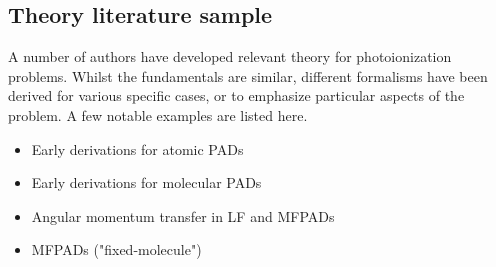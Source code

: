 \subsection{Theory literature sample\label{sec:theory-lit}}

A number of authors have developed relevant theory for photoionization problems. Whilst the fundamentals are similar, different formalisms have been derived for various specific cases, or to emphasize particular aspects of the problem. A few notable examples are listed here.

\begin{itemize}
\item Early derivations for atomic PADs \cite{Cherepkov1979,Cooper1968,Cooper1969,Klar1982}
\item Early derivations for molecular PADs \cite{Buckingham1970}
\item Angular momentum transfer in LF and MFPADs \cite{Fano1972} 
\item MFPADs ("fixed-molecule") \cite{Dill1976}
\end{itemize}